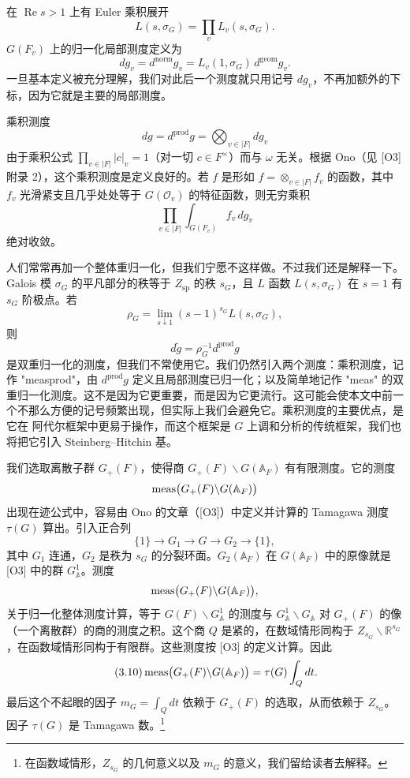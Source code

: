 在 $\operatorname{Re}s>1$ 上有 Euler 乘积展开
\[
L(s,\sigma_G)=\prod_vL_v(s,\sigma_G).
\]
$G(F_v)$ 上的归一化局部测度定义为
\begin{equation}\tag{3.6}
dg_v=d^{\mathrm{norm}}g_v=L_v(1,\sigma_G)\,d^{\mathrm{geom}}g_v.
\end{equation}
一旦基本定义被充分理解，我们对此后一个测度就只用记号 $dg_v$，不再加额外的下标，因为它就是主要的局部测度。

乘积测度
\begin{equation}\tag{3.7}
dg=d^{\mathrm{prod}}g=\bigotimes_{v\in|F|}dg_v
\end{equation}
由于乘积公式 $\prod_{v\in|F|}|c|_v=1$（对一切 $c\in F^\times$）而与 $\omega$ 无关。根据 Ono（见 [O3] 附录 2），这个乘积测度是定义良好的。若 $f$ 是形如 $f=\otimes_{v\in|F|}f_v$ 的函数，其中 $f_v$ 光滑紧支且几乎处处等于 $G(\mathcal O_v)$ 的特征函数，则无穷乘积
\[
\prod_{v\in|F|}\int_{G(F_v)}f_v\,dg_v
\]
绝对收敛。

人们常常再加一个整体重归一化，但我们宁愿不这样做。不过我们还是解释一下。Galois 模 $\sigma_G$ 的平凡部分的秩等于 $Z_{\mathrm{sp}}$ 的秩 $s_G$，且 $L$ 函数 $L(s,\sigma_G)$ 在 $s=1$ 有 $s_G$ 阶极点。若
\begin{equation}\tag{3.8}
\rho_G=\lim_{s\downarrow1}(s-1)^{s_G}L(s,\sigma_G),
\end{equation}
则
\begin{equation}\tag{3.9}
d\tilde g=\rho_G^{-1}d^{\mathrm{prod}}g
\end{equation}
是双重归一化的测度，但我们不常使用它。我们仍然引入两个测度：乘积测度，记作 "measprod"，由 $d^{\mathrm{prod}}g$ 定义且局部测度已归一化；以及简单地记作 "meas" 的双重归一化测度。这不是因为它更重要，而是因为它更流行。这可能会使本文中前一个不那么方便的记号频繁出现，但实际上我们会避免它。乘积测度的主要优点，是它在 阿代尔框架中更易于操作，而这个框架是 $G$ 上调和分析的传统框架，我们也将把它引入 Steinberg–Hitchin 基。

我们选取离散子群 $G_+(F)$，使得商 $G_+(F)\backslash G(\mathbb A_F)$ 有有限测度。它的测度
\[
\operatorname{meas}\bigl(G_+(F)\backslash G(\mathbb A_F)\bigr)
\]
出现在迹公式中，容易由 Ono 的文章（[O3]）中定义并计算的 Tamagawa 测度 $\tau(G)$ 算出。引入正合列
\[
\{1\}\to G_1\to G\to G_2\to\{1\},
\]
其中 $G_1$ 连通，$G_2$ 是秩为 $s_G$ 的分裂环面。$G_2(\mathbb A_F)$ 在 $G(\mathbb A_F)$ 中的原像就是 [O3] 中的群 $G^1_{\mathbb A}$。测度
\[
\operatorname{meas}\bigl(G_+(F)\backslash G(\mathbb A_F)\bigr),
\]
关于归一化整体测度计算，等于 $G(F)\backslash G^1_{\mathbb A}$ 的测度与 $G^1_{\mathbb A}\backslash G_{\mathbb A}$ 对 $G_+(F)$ 的像（一个离散群）的商的测度之积。这个商 $Q$ 是紧的，在数域情形同构于 $Z_{s_G}\backslash\mathbb R^{s_G}$，在函数域情形同构于有限群。这些测度按 [O3] 的定义计算。因此
\begin{equation}\tag{3.10}
\operatorname{meas}\bigl(G_+(F)\backslash G(\mathbb A_F)\bigr)=\tau(G)\int_Qdt.
\end{equation}
最后这个不起眼的因子 $m_G=\int_Qdt$ 依赖于 $G_+(F)$ 的选取，从而依赖于 $Z_{s_G}$。因子 $\tau(G)$ 是 Tamagawa 数。\footnote{在函数域情形，$Z_{s_G}$ 的几何意义以及 $m_G$ 的意义，我们留给读者去解释。}

